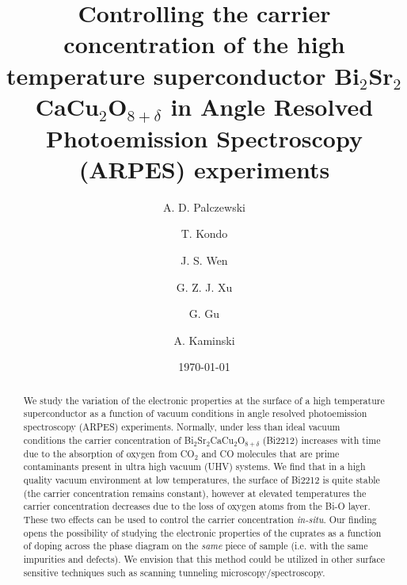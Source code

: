 \documentclass[aps,twocolumn,amsmath,amssymb,showpacs,prb,
superscriptaddress,unsortedaddress]{revtex4}
\begin{document}
\title{Controlling the carrier concentration of the high temperature
superconductor Bi$_2$Sr$_2$CaCu$_2$O$_{8+\delta}$ in Angle Resolved
Photoemission Spectroscopy (ARPES) experiments}

\author{A. D. Palczewski}

\author{T. Kondo}

\author{J. S. Wen}

\author{G. Z. J. Xu}

\author{G. Gu}

\author{A. Kaminski}


\date{\today}

\begin{abstract}
We study the variation of the electronic properties at the surface of
a high temperature superconductor as a function of vacuum conditions
in angle resolved photoemission spectroscopy (ARPES) experiments.
Normally, under less than ideal vacuum conditions the carrier
concentration of Bi$_2$Sr$_2$CaCu$_2$O$_{8+\delta}$ (Bi2212) increases
with time due to the absorption of oxygen from CO$_2$  and CO
molecules that are prime contaminants present in ultra high vacuum
(UHV) systems. We find that in a high quality vacuum environment at
low temperatures, the surface of Bi2212 is quite stable (the carrier
concentration remains constant), however at elevated temperatures the
carrier concentration decreases due to the loss of oxygen atoms from
the Bi-O layer. These two effects can be used to control the carrier
concentration \textit{in-situ}. Our finding opens the possibility of
studying the electronic properties of the cuprates as a function of
doping across the phase diagram on the \textit{same} piece of sample
(i.e. with the same impurities and defects). We envision that this
method could be utilized in other surface sensitive techniques such as
scanning tunneling microscopy/spectroscopy.
\end{abstract}
\end{document}
